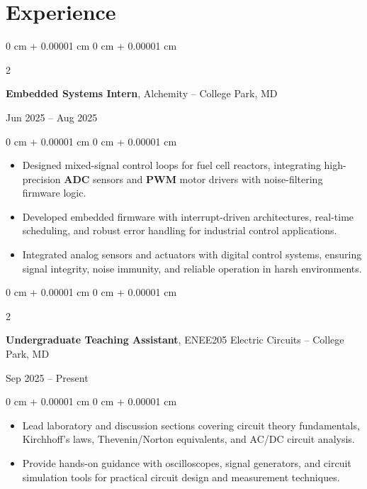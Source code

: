 \documentclass[10pt, letterpaper]{article}
\newenvironment{highlights}{
    \begin{itemize}[
        topsep=0.05 cm,
        parsep=0.05 cm,
        partopsep=0pt,
        itemsep=0pt,
        leftmargin=0 cm + 10pt
    ]
}{
    \end{itemize}
}
\newenvironment{onecolentry}{
    \begin{adjustwidth}{
        0 cm + 0.00001 cm
    }{
        0 cm + 0.00001 cm
    }
}{
    \end{adjustwidth}
}
\newenvironment{twocolentry}[2][]{
    \onecolentry
    \def\secondColumn{#2}
    \setcolumnwidth{\fill, 4.5 cm}
    \begin{paracol}{2}
}{
    \switchcolumn \raggedleft \secondColumn
    \end{paracol}
    \endonecolentry
}
\begin{document}
    \section{Experience}

        \begin{twocolentry}{
            Jun 2025 – Aug 2025
        }
            \textbf{Embedded Systems Intern}, Alchemity -- College Park, MD
        \end{twocolentry}
        \vspace{0.05 cm}
        \begin{onecolentry}
            \begin{highlights}
                \item Designed mixed-signal control loops for fuel cell reactors, integrating high-precision \textbf{ADC} sensors and \textbf{PWM} motor drivers with noise-filtering firmware logic.
                \item Developed embedded firmware with interrupt-driven architectures, real-time scheduling, and robust error handling for industrial control applications.
                \item Integrated analog sensors and actuators with digital control systems, ensuring signal integrity, noise immunity, and reliable operation in harsh environments.
            \end{highlights}
        \end{onecolentry}

        \vspace{0.10 cm}

        \begin{twocolentry}{
            Sep 2025 – Present
        }
            \textbf{Undergraduate Teaching Assistant}, ENEE205 Electric Circuits -- College Park, MD
        \end{twocolentry}
        \vspace{0.05 cm}
        \begin{onecolentry}
            \begin{highlights}
                \item Lead laboratory and discussion sections covering circuit theory fundamentals, Kirchhoff's laws, Thevenin/Norton equivalents, and AC/DC circuit analysis.
                \item Provide hands-on guidance with oscilloscopes, signal generators, and circuit simulation tools for practical circuit design and measurement techniques.
            \end{highlights}
        \end{onecolentry}
\end{document}
